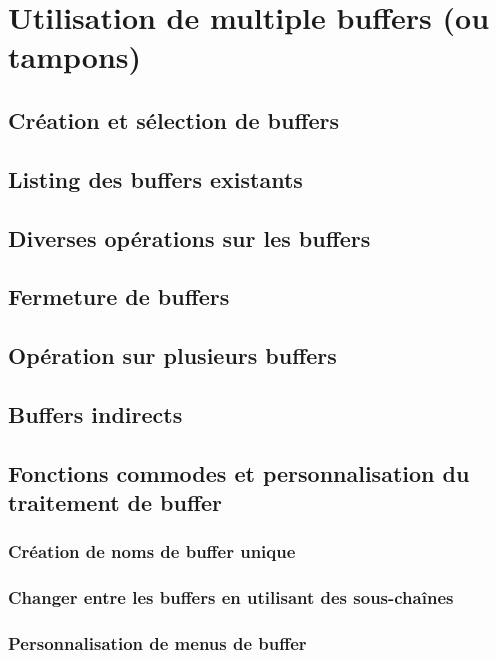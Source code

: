 \chapter{Utilisation de multiple buffers (ou tampons)}\label{chap16}

\section{Création et sélection de buffers}\label{chap16sec1}
\section{Listing des buffers existants}\label{chap16sec2}
\section{Diverses opérations sur les buffers}\label{chap16sec3}
\section{Fermeture de buffers}\label{chap16sec4}
\section{Opération sur plusieurs buffers}\label{chap16sec5}
\section{Buffers indirects}\label{chap16sec6}
\section{Fonctions commodes et personnalisation du traitement de
  buffer}\label{chap16sec7}
\subsection{Création de noms de buffer unique}\label{chap16sec8}
\subsection{Changer entre les buffers en utilisant des
  sous-chaînes}\label{chap16sec9} 
\subsection{Personnalisation de menus de buffer}\label{chap16sec10}
